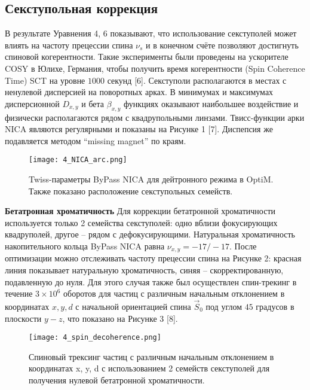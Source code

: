 \subsection{Секступольная коррекция}\label{sec:EDM/Wien_filter_tracking/sextupole_correction}

\par В результате Уравнения 4, 6 показывают, что использование секступолей может влиять на частоту прецессии спина $\nu_s$ и в конечном счёте позволяют достигнуть спиновой когерентности. Такие эксперименты были проведены на ускорителе COSY в Юлихе, Германия, чтобы получить время когерентности (Spin Coherence Time) SCT на уровне $1000$ секунд [6]. Секступоли располагаются в местах с ненулевой дисперсией на поворотных арках. В минимумах и максимумах дисперсионной $D_{x,y}$ и бета $\beta_{x,y}$ функциях оказывают наибольшее воздействие и физически располагаются рядом с квадрупольными линзами. Твисс-функции арки NICA являются регулярными и показаны на Рисунке 1 [7]. Диспепсия же подавляется методом “missing magnet” по краям.

\begin{figure}[!h]
  \centering
   \texttt{[image: 4\_NICA\_arc.png]}
   \caption{Twiss-параметры ByPass NICA для дейтронного режима в OptiM. Также показано расположение секступольных семейств.}
   \label{fig:4_NICA_arc}
\end{figure}

\textbf{Бетатронная хроматичность}
Для коррекции бетатронной хроматичности используется только 2 семейства секступолей: одно вблизи фокусирующих квадруполей, другое – рядом с дефокусирующими. Натуральная хроматичность накопительного кольца ByPass NICA равна $\nu_{x,y}=-17/-17$. После оптимизации можно отслеживать частоту прецессии спина на Рисунке 2: красная линия показывает натуральную хроматичность, синяя – скорректированную, подавленную до нуля. Для этого случая также был осуществлен спин-трекинг в течение $3\times{10}^6$ оборотов для частиц с различным начальным отклонением в координатах $x, y, d$ с начальной ориентацией спина ${\vec{S}}_0$ под углом $45$ градусов в плоскости $y-z$, что показано на Рисунке 3 [8].

\begin{figure}[!h]
  \centering
   \texttt{[image: 4\_spin\_decoherence.png]}
   \caption{Спиновый трексинг частиц с различным начальным отклонением в координатах x, y, d с использованием 2 семейств секступолей для получения нулевой бетатронной хроматичности.}
   \label{fig:4_spin_decoherence}
\end{figure}

